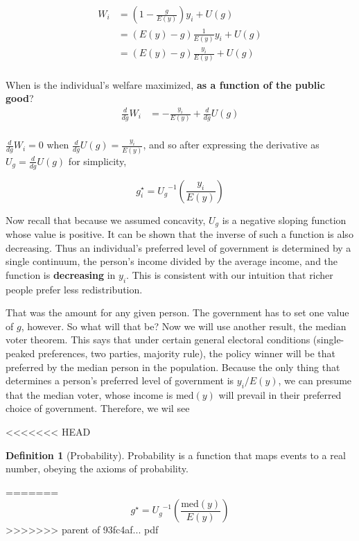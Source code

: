 \documentclass[]{book}
\theoremstyle{definition}
\newtheorem{definition}{Definition}[chapter]
\theoremstyle{definition}
\theoremstyle{definition}
\theoremstyle{remark}
\begin{document}
\begin{align*}
W_i &= \left(1 - \frac{g}{E(y)}\right)y_i + U(g)\\
&= \left(E(y) - g\right) \frac{1}{E(y)} y_i + U(g)\\
&= \left(E(y) - g\right) \frac{y_i}{E(y)} + U(g)\\
\end{align*}

When is the individual's welfare maximized, \textbf{as a function of the public good}?
\begin{align*}
\frac{d}{dg}W_i &=  - \frac{y_i}{E(y)} + \frac{d}{dg}U(g)\\
\end{align*}

\(\frac{d}{dg}W_i = 0\) when \(\frac{d}{dg}U(g) = \frac{y_i}{E(y)}\), and so after expressing the derivative as \(U_g = \frac{d}{dg}U(g)\) for simplicity,

\[g_i^\star = {U_g}^{-1}\left(\frac{y_i}{E(y)}\right)\]

Now recall that because we assumed concavity, \(U_g\) is a negative sloping function whose value is positive. It can be shown that the inverse of such a function is also decreasing. Thus an individual's preferred level of government is determined by a single continuum, the person's income divided by the average income, and the function is \textbf{decreasing} in \(y_i\). This is consistent with our intuition that richer people prefer less redistribution.

That was the amount for any given person. The government has to set one value of \(g\), however. So what will that be? Now we will use another result, the median voter theorem. This says that under certain general electoral conditions (single-peaked preferences, two parties, majority rule), the policy winner will be that preferred by the median person in the population. Because the only thing that determines a person's preferred level of government is \(y_i / E(y)\), we can presume that the median voter, whose income is \(\text{med}(y)\) will prevail in their preferred choice of government. Therefore, we wil see

<<<<<<< HEAD
\begin{definition}[Probability]
\protect\hypertarget{def:unnamed-chunk-66}{}{\label{def:unnamed-chunk-66} {} }
Probability is a function that maps events to a real number, obeying the axioms of probability.
\end{definition}
=======
\[g^\star = {U_g}^{-1}\left(\frac{\text{med}(y)}{E(y)}\right)\]
>>>>>>> parent of 93fc4af... pdf
\end{document}
